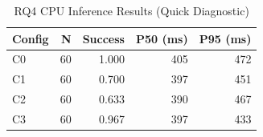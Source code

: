 \begin{table}[htbp]
\caption{RQ4 CPU Inference Results (Quick Diagnostic)}
\label{tab:rq4-cpu-quick}
\centering\small
\begin{tabular}{lrrrr}
\toprule
\textbf{Config} & \textbf{N} & \textbf{Success} & \textbf{P50 (ms)} & \textbf{P95 (ms)} \\
\midrule
  C0 & 60 & 1.000 & 405 & 472 \\
  C1 & 60 & 0.700 & 397 & 451 \\
  C2 & 60 & 0.633 & 390 & 467 \\
  C3 & 60 & 0.967 & 397 & 433 \\
\bottomrule
\end{tabular}
\end{table}